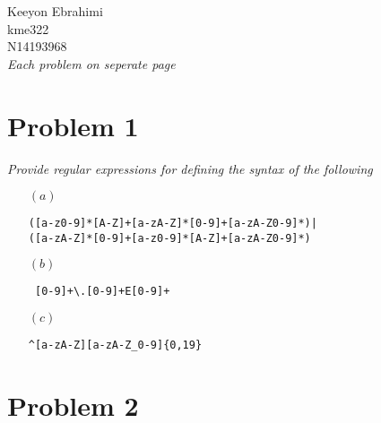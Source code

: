\documentclass[1pt]{article}
\begin{document}
{\Large
Keeyon Ebrahimi \\
kme322\\
N14193968\\
}
\textit{Each problem on seperate page}
\section{Problem 1}

\textit{Provide regular expressions for defining the syntax of the following}
\begin{enumerate}
\item[$(a)$] 
\begin{verbatim}
([a-z0-9]*[A-Z]+[a-zA-Z]*[0-9]+[a-zA-Z0-9]*)|
([a-zA-Z]*[0-9]+[a-z0-9]*[A-Z]+[a-zA-Z0-9]*)
\end{verbatim}
\item[$(b)$]
\begin{verbatim}
 [0-9]+\.[0-9]+E[0-9]+
\end{verbatim}
\item[$(c)$] 
\begin{verbatim}
^[a-zA-Z][a-zA-Z_0-9]{0,19}
\end{verbatim}
\end{enumerate}
\pagebreak

\section{Problem 2}
\end{document}

